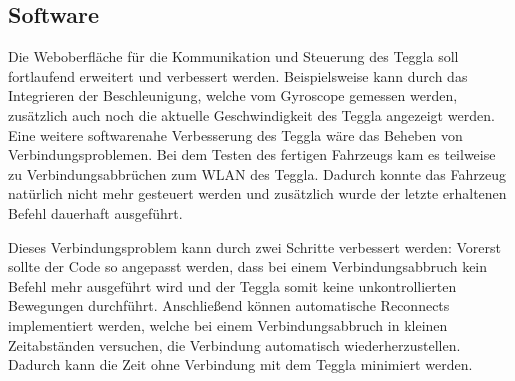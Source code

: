 \subsection{Software}

Die Weboberfläche für die Kommunikation und Steuerung des Teggla soll fortlaufend erweitert und verbessert werden. 
Beispielsweise kann durch das Integrieren der Beschleunigung, welche vom Gyroscope gemessen werden, zusätzlich auch noch die aktuelle Geschwindigkeit des Teggla angezeigt werden.\\

Eine weitere softwarenahe Verbesserung des Teggla wäre das Beheben von Verbindungsproblemen. 
Bei dem Testen des fertigen Fahrzeugs kam es teilweise zu Verbindungsabbrüchen zum WLAN des Teggla. 
Dadurch konnte das Fahrzeug natürlich nicht mehr gesteuert werden und zusätzlich wurde der letzte erhaltenen Befehl dauerhaft ausgeführt. 

Dieses Verbindungsproblem kann durch zwei Schritte verbessert werden: Vorerst sollte der Code so angepasst werden, dass bei einem Verbindungsabbruch kein Befehl mehr ausgeführt wird und der Teggla somit keine unkontrollierten Bewegungen durchführt. 
Anschließend können automatische Reconnects implementiert werden, welche bei einem Verbindungsabbruch in kleinen Zeitabständen versuchen, die Verbindung automatisch wiederherzustellen. 
Dadurch kann die Zeit ohne Verbindung mit dem Teggla minimiert werden.
